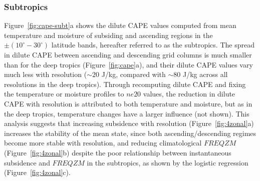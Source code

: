 \documentclass[times]{qjrms4}
\begin{document}
\subsubsection{Subtropics}

Figure~\ref{fig:cape-subt}a shows the dilute CAPE values computed from mean temperature and moisture of subsiding and ascending regions in the $\pm \left( 10^{\circ}-30^{\circ} \right) $ latitude bands, hereafter referred to as the subtropics. The spread in dilute CAPE between ascending and descending grid columns is much smaller than for the deep tropics (Figure~\ref{fig:cape}a), and their dilute CAPE  values vary much less with resolution ($\sim 20$ J/kg, compared with $\sim 80$ J/kg across all resolutions in the deep tropics). Through recomputing dilute CAPE and fixing the temperature or moisture profiles to $ne20$ values, the reduction in dilute CAPE with resolution is attributed to both temperature and moisture, but as in the deep tropics, temperature changes have a larger influence (not shown). This analysis suggests that increasing subsidence with resolution (Figure~\ref{fig:4zonal}a) increases the stability of the mean state, since both ascending/descending regimes become more stable with resolution, and reducing climatological $FREQZM$ (Figure~\ref{fig:4zonal}b) despite the poor relationship between instantaneous subsidence and $FREQZM$ in the subtropics, as shown by the logistic regression (Figure~\ref{fig:4zonal}c).
\end{document}
